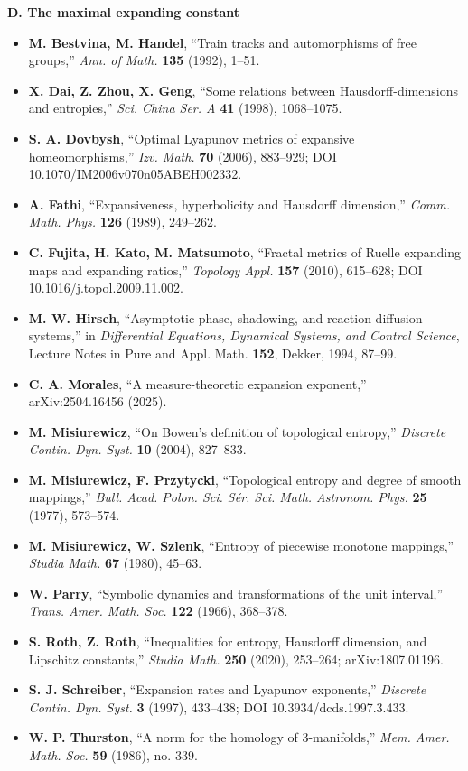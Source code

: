 \documentclass[
]{article}
\providecommand{\tightlist}{%
  \setlength{\itemsep}{0pt}\setlength{\parskip}{0pt}}
\begin{document}
\textbf{D. The maximal expanding constant}

\begin{itemize}
\tightlist
\item
  \textbf{M. Bestvina, M. Handel}, ``Train tracks and automorphisms of
  free groups,'' \emph{Ann. of Math.} \textbf{135} (1992), 1--51.
\item
  \textbf{X. Dai, Z. Zhou, X. Geng}, ``Some relations between
  Hausdorff-dimensions and entropies,'' \emph{Sci. China Ser. A}
  \textbf{41} (1998), 1068--1075.
\item
  \textbf{S. A. Dovbysh}, ``Optimal Lyapunov metrics of expansive
  homeomorphisms,'' \emph{Izv. Math.} \textbf{70} (2006), 883--929; DOI
  10.1070/IM2006v070n05ABEH002332.
\item
  \textbf{A. Fathi}, ``Expansiveness, hyperbolicity and Hausdorff
  dimension,'' \emph{Comm. Math. Phys.} \textbf{126} (1989), 249--262.
\item
  \textbf{C. Fujita, H. Kato, M. Matsumoto}, ``Fractal metrics of Ruelle
  expanding maps and expanding ratios,'' \emph{Topology Appl.}
  \textbf{157} (2010), 615--628; DOI 10.1016/j.topol.2009.11.002.
\item
  \textbf{M. W. Hirsch}, ``Asymptotic phase, shadowing, and
  reaction-diffusion systems,'' in \emph{Differential Equations,
  Dynamical Systems, and Control Science}, Lecture Notes in Pure and
  Appl. Math. \textbf{152}, Dekker, 1994, 87--99.
\item
  \textbf{C. A. Morales}, ``A measure-theoretic expansion exponent,''
  arXiv:2504.16456 (2025).
\item
  \textbf{M. Misiurewicz}, ``On Bowen's definition of topological
  entropy,'' \emph{Discrete Contin. Dyn. Syst.} \textbf{10} (2004),
  827--833.
\item
  \textbf{M. Misiurewicz, F. Przytycki}, ``Topological entropy and
  degree of smooth mappings,'' \emph{Bull. Acad. Polon. Sci. S\'{e}r.
  Sci. Math. Astronom. Phys.} \textbf{25} (1977), 573--574.
\item
  \textbf{M. Misiurewicz, W. Szlenk}, ``Entropy of piecewise monotone
  mappings,'' \emph{Studia Math.} \textbf{67} (1980), 45--63.
\item
  \textbf{W. Parry}, ``Symbolic dynamics and transformations of the unit
  interval,'' \emph{Trans. Amer. Math. Soc.} \textbf{122} (1966),
  368--378.
\item
  \textbf{S. Roth, Z. Roth}, ``Inequalities for entropy, Hausdorff
  dimension, and Lipschitz constants,'' \emph{Studia Math.} \textbf{250}
  (2020), 253--264; arXiv:1807.01196.
\item
  \textbf{S. J. Schreiber}, ``Expansion rates and Lyapunov exponents,''
  \emph{Discrete Contin. Dyn. Syst.} \textbf{3} (1997), 433--438; DOI
  10.3934/dcds.1997.3.433.
\item
  \textbf{W. P. Thurston}, ``A norm for the homology of 3-manifolds,''
  \emph{Mem. Amer. Math. Soc.} \textbf{59} (1986), no. 339.
\end{itemize}
\end{document}
